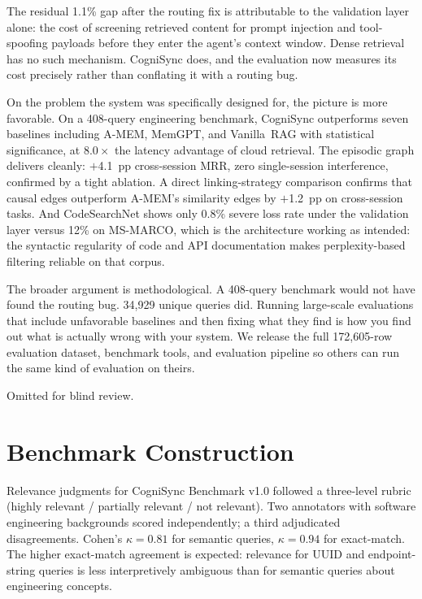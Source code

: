 \documentclass[sigconf,authordraft]{acmart}
\begin{document}
The residual 1.1\% gap after the routing fix is attributable to the
validation layer alone: the cost of screening retrieved content for prompt
injection and tool-spoofing payloads before they enter the agent's context
window. Dense retrieval has no such mechanism. CogniSync does, and the
evaluation now measures its cost precisely rather than conflating it with
a routing bug.

On the problem the system was specifically designed for, the picture is
more favorable. On a 408-query engineering benchmark, CogniSync outperforms
seven baselines including A-MEM, MemGPT, and Vanilla~RAG with statistical
significance, at $8.0\times$ the latency advantage of cloud retrieval. The
episodic graph delivers cleanly: $+$4.1~pp cross-session MRR, zero
single-session interference, confirmed by a tight ablation. A direct
linking-strategy comparison confirms that causal edges outperform A-MEM's
similarity edges by $+$1.2~pp on cross-session tasks. And CodeSearchNet
shows only 0.8\% severe loss rate under the validation layer versus 12\%
on MS-MARCO, which is the architecture working as intended: the syntactic
regularity of code and API documentation makes perplexity-based filtering
reliable on that corpus.

The broader argument is methodological. A 408-query benchmark would not
have found the routing bug. 34,929 unique queries did. Running large-scale
evaluations that include unfavorable baselines and then fixing what
they find is how you find out what is actually wrong with your system.
We release the full 172,605-row evaluation dataset, benchmark tools, and
evaluation pipeline so others can run the same kind of evaluation on theirs.

\begin{acks}
Omitted for blind review.
\end{acks}




\appendix

\section{Benchmark Construction}

Relevance judgments for CogniSync Benchmark v1.0 followed a three-level
rubric (highly relevant / partially relevant / not relevant). Two annotators
with software engineering backgrounds scored independently; a third
adjudicated disagreements. Cohen's $\kappa = 0.81$ for semantic queries,
$\kappa = 0.94$ for exact-match. The higher exact-match agreement is
expected: relevance for UUID and endpoint-string queries is less
interpretively ambiguous than for semantic queries about engineering concepts.
\end{document}
